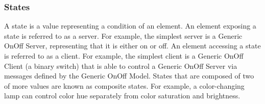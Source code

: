 \documentclass[\main/main.tex]{subfiles}
\begin{document}
\subsubsection{States}
A state is a value representing a condition of an element.
\newline\newline
An element exposing a state is referred to as a server. For example, the simplest server is a Generic OnOff Server, representing that it is either on or off.
\newline\newline
An element accessing a state is referred to as a client. For example, the simplest client is a Generic OnOff Client (a binary switch) that is able to control a Generic OnOff Server via messages defined by the Generic OnOff Model.
\newline\newline
States that are composed of two of more values are known as composite states. For example, a color-changing lamp can control color hue separately from color saturation and brightness.
\end{document}
